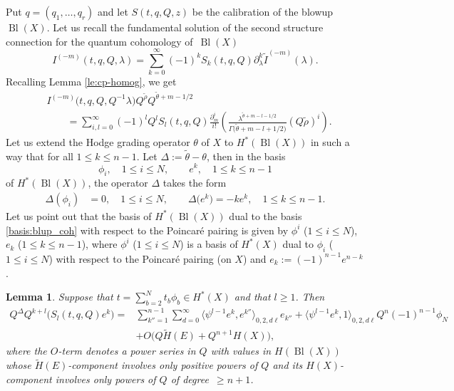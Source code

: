 \documentclass[pdftex]{sigma}
\numberwithin{equation}{section}
\newtheorem{Lemma}[Theorem]{Lemma}
\begin{document}
Put $q=(q_1,\dots, q_r)$ and let $S(t,q,Q,z)$ be the calibration of
the blowup $\operatorname{Bl}(X)$. Let us recall the fundamental solution of
the second structure connection for the quantum cohomology of~$\operatorname{Bl}(X)$
\[
I^{(-m)}(t,q,Q,\lambda) = \sum_{k=0}^\infty (-1)^k
S_k(t,q,Q) \partial_\lambda^k
\widetilde{I}^{(-m)}(\lambda).
\]
Recalling Lemma \ref{le:cp-homog}, we get
\begin{align}
&
I^{(-m)}\big(t,q,Q,Q^{-1}\lambda\big)
Q^{\widetilde{\rho}}
Q^{\widetilde{\theta}+m-1/2} \nonumber \\
&\qquad=
\sum_{i,l=0}^\infty (-1)^l
Q^l S_l(t,q,Q) \frac{\partial^i_m}{i!} \left(
\frac{\lambda^{\widetilde{\theta}+m-l-1/2}}{
\Gamma\big(\widetilde{\theta}+m-l+1/2\big)} (Q \widetilde{\rho})^i
\right).\label{pv-homog}
\end{align}
Let us extend the Hodge grading operator $\theta$ of $X$ to
$H^*(\operatorname{Bl}(X))$ in such a way that
for all $1\leq k\leq n-1$. Let $\Delta:=\widetilde{\theta}-\theta$,
then in the basis
\begin{equation}\label{basis:blup_coh}
\phi_i,\quad 1\leq i\leq N, \qquad
e^k,\quad 1\leq k\leq n-1
\end{equation}
of $H^*(\operatorname{Bl}(X))$, the operator $\Delta$ takes the form
\begin{align*}
\Delta(\phi_i) & = 0, \quad 1\leq i\leq N,\qquad
\Delta\big(e^k\big) = -k e^k, \quad 1\leq k\leq n-1.
\end{align*}
Let us point out that the basis of $H^*(\operatorname{Bl}(X))$ dual to the basis
\eqref{basis:blup_coh} with respect to the Poincar\'e pairing is given by
$\phi^i$ ($1\leq i\leq N$),
$e_k$ ($1\leq k\leq n-1$),
where $\phi^i$ ($1\leq i\leq N$) is a basis of $H^*(X)$
dual to $\phi_i$ ($1\leq i\leq N$) with respect to the Poincar\'e pairing
(on $X$) and $e_k:= (-1)^{n-1} e^{n-k}$.
\begin{Lemma}\label{le:calibr_Q-homog}
Suppose that $t=\sum_{b=2}^N t_b \phi_b\in H^*(X)$ and that $l\geq 1$. Then
\begin{align*}
Q^\Delta Q^{k+l} \big(S_l(t,q,Q) e^k\big) ={} &
\sum_{k''=1}^{n-1} \sum_{d=0}^\infty
\big\langle \psi^{l-1} e^k, e^{k''}\big\rangle_{0,2,d\ell} e_{k''} +
\big\langle \psi^{l-1} e^k, 1\big\rangle_{0,2,d\ell} Q^n (-1)^{n-1}\phi_N \\
& +O\big(Q\widetilde{H}(E) + Q^{n+1} H(X)\big),
\end{align*}
where the $O$-term denotes a power series in $Q$ with values in $H(\operatorname{Bl}(X))$ whose $\widetilde{H}(E)$-component involves only positive
powers of $Q$ and its $H(X)$-component involves only powers of $Q$ of degree~${\geq n+1}$.
\end{Lemma}
\end{document}
